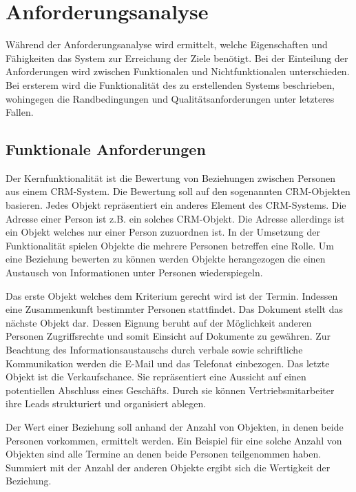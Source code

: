 \section{Anforderungsanalyse}
\label{ch:Systemanalyse:sec:Anforderungsanalyse}

Während der Anforderungsanalyse wird ermittelt, welche Eigenschaften und Fähigkeiten das System zur Erreichung der Ziele benötigt. Bei der Einteilung der Anforderungen wird zwischen Funktionalen und Nichtfunktionalen unterschieden. Bei ersterem wird die Funktionalität des zu erstellenden Systems beschrieben, wohingegen die Randbedingungen und Qualitätsanforderungen unter letzteres Fallen. 

\subsection{Funktionale Anforderungen}

Der Kernfunktionalität ist die Bewertung von Beziehungen zwischen Personen aus einem CRM-System. Die Bewertung soll auf den sogenannten CRM-Objekten basieren. Jedes Objekt repräsentiert ein anderes Element des CRM-Systems. Die Adresse einer Person ist z.B. ein solches CRM-Objekt. Die Adresse allerdings ist ein Objekt welches nur einer Person zuzuordnen ist. In der Umsetzung der Funktionalität spielen Objekte die mehrere Personen betreffen eine Rolle. Um eine Beziehung bewerten zu können werden Objekte herangezogen die einen Austausch von Informationen unter Personen wiederspiegeln.
 
Das erste Objekt welches dem Kriterium gerecht wird ist der Termin. Indessen eine Zusammenkunft bestimmter Personen stattfindet. Das Dokument stellt das nächste Objekt dar. Dessen Eignung beruht auf der Möglichkeit anderen Personen Zugriffsrechte und somit Einsicht auf Dokumente zu gewähren. Zur Beachtung des Informationsaustauschs durch verbale sowie schriftliche Kommunikation werden die E-Mail und das Telefonat einbezogen. Das letzte Objekt ist die Verkaufschance. Sie repräsentiert eine Aussicht auf einen potentiellen Abschluss eines Geschäfts. Durch sie können Vertriebsmitarbeiter ihre Leads strukturiert und organisiert ablegen.

Der Wert einer Beziehung soll anhand der Anzahl von Objekten, in denen beide Personen vorkommen, ermittelt werden. Ein Beispiel für eine solche Anzahl von Objekten sind alle Termine an denen beide Personen teilgenommen haben. Summiert mit der Anzahl der anderen Objekte ergibt sich die Wertigkeit der Beziehung. 

